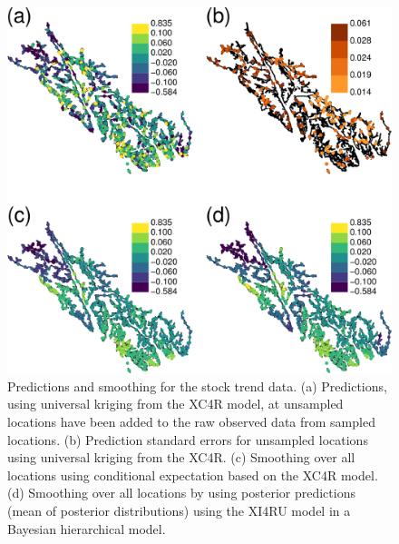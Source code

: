 \documentclass[11pt, titlepage]{article}\usepackage[]{graphicx}\usepackage[]{color}
\begin{document}
\begin{figure}[H]
  \begin{center}
  \includegraphics[width=\linewidth]{figure/Fig-PredSmoo.png}
  \end{center}
  \caption{Predictions and smoothing for the stock trend data. (a) Predictions, using universal kriging from the XC4R model, at unsampled locations have been added to the raw observed data from sampled locations. (b) Prediction standard errors for unsampled locations using universal kriging from the XC4R. (c) Smoothing over all locations using conditional expectation based on the XC4R model.  (d) Smoothing over all locations by using posterior predictions (mean of posterior distributions) using the XI4RU model in a Bayesian hierarchical model.  \label{Fig-PredSmoo}}     
\end{figure}


\end{document}
